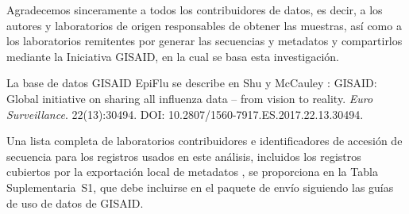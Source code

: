 \documentclass[11pt]{article}
\begin{document}
Agradecemos sinceramente a todos los contribuidores de datos, es decir, a los autores y laboratorios de origen responsables de obtener las muestras, así como a los laboratorios remitentes por generar las secuencias y metadatos y compartirlos mediante la Iniciativa GISAID, en la cual se basa esta investigación.

La base de datos GISAID EpiFlu se describe en Shu y McCauley \cite{shu2017gisaid}: GISAID: Global initiative on sharing all influenza data -- from vision to reality. \emph{Euro Surveillance}. 22(13):30494. DOI: 10.2807/1560-7917.ES.2017.22.13.30494.

Una lista completa de laboratorios contribuidores e identificadores de accesión de secuencia para los registros usados en este análisis, incluidos los registros cubiertos por la exportación local de metadatos , se proporciona en la Tabla Suplementaria~S1, que debe incluirse en el paquete de envío siguiendo las guías de uso de datos de GISAID.



\end{document}
